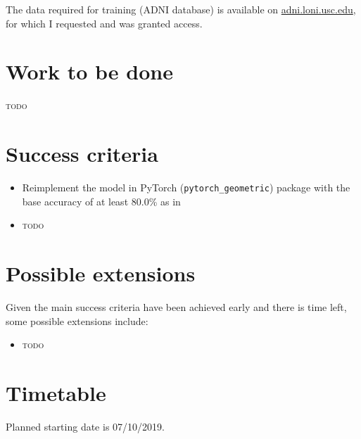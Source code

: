 \documentclass[12pt,a4paper,twoside]{article}
\begin{document}
The data required for training (ADNI database) is available on \url{adni.loni.usc.edu}, for which I requested and was granted access.

\section*{Work to be done}


\textsc{todo}

\section*{Success criteria}


\begin{itemize}
  \item Reimplement the model in PyTorch (\texttt{pytorch\_geometric}) package with the base accuracy of at least 80.0\% as in \cite{parisot2018disease}
  \item \textsc{todo}
\end{itemize}


\section*{Possible extensions}


Given the main success criteria have been achieved early and there is time left, some possible extensions include: 
\begin{itemize}
  \item \textsc{todo}
\end{itemize}


\section*{Timetable}


Planned starting date is 07/10/2019.
\end{document}
